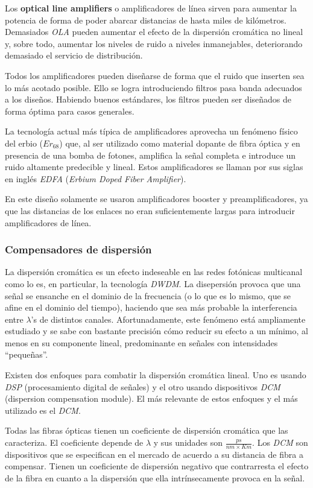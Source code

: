 Los \textbf{optical line amplifiers} o amplificadores de línea sirven para
aumentar la potencia de forma de poder abarcar distancias de hasta miles
de kilómetros. Demasiados \emph{OLA} pueden aumentar el efecto de la
dispersión cromática no lineal y, sobre todo, aumentar los niveles de
ruido a niveles inmanejables, deteriorando demasiado el servicio de
distribución.

Todos los amplificadores pueden diseñarse de forma que el ruido que
inserten sea lo más acotado posible. Ello se logra introduciendo
filtros pasa banda adecuados a los diseños. Habiendo buenos
estándares, los filtros pueden ser diseñados de forma óptima para
casos generales.

La tecnología actual más típica de amplificadores aprovecha un
fenómeno físico del erbio ($Er_{68}$) que, al ser utilizado como
material dopante de fibra óptica y en presencia de una bomba de
fotones, amplifica la señal completa e introduce un ruido altamente
predecible y lineal. Estos amplificadores se llaman por sus siglas en
inglés \emph{EDFA} (\emph{Erbium Doped Fiber Amplifier}).

En este diseño solamente se usaron amplificadores booster y
preamplificadores, ya que las distancias de los enlaces no eran
suficientemente largas para introducir amplificadores de línea.

\subsubsection{Compensadores de dispersión}
\label{sec:dispersion}

La dispersión cromática es un efecto indeseable en las redes fotónicas
multicanal como lo es, en particular, la tecnología \emph{DWDM}. La
disepersión provoca que una señal se ensanche en el dominio de la
frecuencia (o lo que es lo mismo, que se afine en el dominio del
tiempo), haciendo que sea más probable la interferencia entre
$\lambda$'s de distintos canales. Afortunadamente, este fenómeno está
ampliamente estudiado y se sabe con bastante precisión cómo reducir su
efecto a un mínimo, al menos en su componente lineal, predominante en
señales con intensidades ``pequeñas''.

Existen dos enfoques para combatir la dispersión cromática lineal. Uno
es usando \emph{DSP} (procesamiento digital de señales) y el otro
usando dispositivos \emph{DCM} (dispersion compensation module). El
más relevante de estos enfoques y el más utilizado es el \emph{DCM}.

Todas las fibras ópticas tienen un coeficiente de dispersión cromática
que las caracteriza. El coeficiente depende de $\lambda$ y sus
unidades son $\frac{ps}{nm \times Km}$. Los \emph{DCM} son
dispositivos que se especifican en el mercado de acuerdo a su
distancia de fibra a compensar. Tienen un coeficiente de dispersión
negativo que contrarresta el efecto de la fibra en cuanto a la
dispersión que ella intrínsecamente provoca en la señal.

